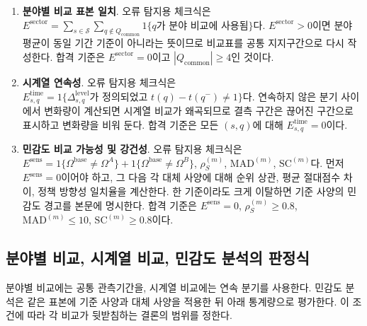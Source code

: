 \documentclass[11pt,a4paper]{report}
\newenvironment{summaryenum}{\begin{enumerate}[label=\arabic*.,leftmargin=1.8em,itemsep=0.45em,topsep=0.35em]\RaggedRight}{\end{enumerate}}
\begin{document}
\begin{summaryenum}
  \item \textbf{분야별 비교 표본 일치}. 오류 탐지용 체크식은 $E^{\mathrm{sector}}=\sum_{s \in \mathcal{S}}\sum_{q \notin Q_{\mathrm{common}}}1\{q \text{가 분야 비교에 사용됨}\}$다. $E^{\mathrm{sector}}>0$이면 분야 평균이 동일 기간 기준이 아니라는 뜻이므로 비교표를 공통 지지구간으로 다시 작성한다. 합격 기준은 $E^{\mathrm{sector}}=0$이고 $|Q_{\mathrm{common}}|\ge 4$인 것이다.
  \item \textbf{시계열 연속성}. 오류 탐지용 체크식은 $E^{\mathrm{time}}_{s,q}=1\{\Delta^{\mathrm{level}}_{s,q}\text{가 정의되었고 }t(q)-t(q^{-})\neq 1\}$다. 연속하지 않은 분기 사이에서 변화량이 계산되면 시계열 비교가 왜곡되므로 결측 구간은 끊어진 구간으로 표시하고 변화량을 비워 둔다. 합격 기준은 모든 $(s,q)$에 대해 $E^{\mathrm{time}}_{s,q}=0$이다.
  \item \textbf{민감도 비교 가능성 및 강건성}. 오류 탐지용 체크식은 $E^{\mathrm{sens}}=1\{\Omega^{\mathrm{base}}\neq\Omega^{A}\}+1\{\Omega^{\mathrm{base}}\neq\Omega^{B}\}$, \quad $\rho^{(m)}_{S}$, $\mathrm{MAD}^{(m)}$, $\mathrm{SC}^{(m)}$다. 먼저 $E^{\mathrm{sens}}=0$이어야 하고, 그 다음 각 대체 사양에 대해 순위 상관, 평균 절대점수 차이, 정책 방향성 일치율을 계산한다. 한 기준이라도 크게 이탈하면 기준 사양의 민감도 경고를 본문에 명시한다. 합격 기준은 $E^{\mathrm{sens}}=0$, $\rho^{(m)}_{S}\ge 0.8$, $\mathrm{MAD}^{(m)}\le 10$, $\mathrm{SC}^{(m)}\ge 0.8$이다.
\end{summaryenum}
\endgroup

\subsection{분야별 비교, 시계열 비교, 민감도 분석의 판정식}
분야별 비교에는 공통 관측기간을, 시계열 비교에는 연속 분기를 사용한다. 민감도 분석은 같은 표본에 기준 사양과 대체 사양을 적용한 뒤 아래 통계량으로 평가한다. 이 조건에 따라 각 비교가 뒷받침하는 결론의 범위를 정한다.
\end{document}
